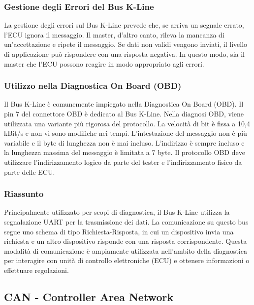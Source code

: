 \subsubsection{Gestione degli Errori del Bus K-Line}

La gestione degli errori sul Bus K-Line prevede che, se arriva un segnale errato, l'ECU ignora il messaggio. Il master, d'altro canto, rileva la mancanza di un'accettazione e ripete il messaggio. Se dati non validi vengono inviati, il livello di applicazione può rispondere con una risposta negativa. In questo modo, sia il master che l'ECU possono reagire in modo appropriato agli errori.

\subsubsection{Utilizzo nella Diagnostica On Board (OBD)}

Il Bus K-Line è comunemente impiegato nella Diagnostica On Board (OBD). Il pin 7 del connettore OBD è dedicato al Bus K-Line. Nella diagnosi OBD, viene utilizzata una variante più rigorosa del protocollo. La velocità di bit è fissa a 10,4 kBit/s e non vi sono modifiche nei tempi. L'intestazione del messaggio non è più variabile e il byte di lunghezza non è mai incluso. L'indirizzo è sempre incluso e la lunghezza massima del messaggio è limitata a 7 byte. Il protocollo OBD deve utilizzare l'indirizzamento logico da parte del tester e l'indirizzamento fisico da parte delle ECU.


\subsubsection{Riassunto}
Principalmente utilizzato per scopi di diagnostica, il Bus K-Line utilizza la segnalazione UART per la trasmissione dei dati. La comunicazione su questo bus segue uno schema di tipo Richiesta-Risposta, in cui un dispositivo invia una richiesta e un altro dispositivo risponde con una risposta corrispondente. Questa modalità di comunicazione è ampiamente utilizzata nell'ambito della diagnostica per interagire con unità di controllo elettroniche (ECU) e ottenere informazioni o effettuare regolazioni.







\subsection{CAN - Controller Area Network}

